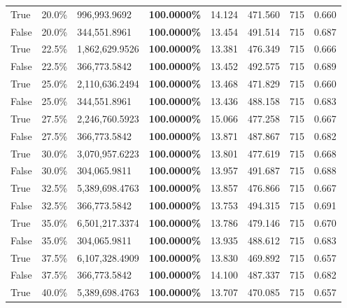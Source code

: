 \begin{table}[H]
\begin{tabular}{lllrllll}
\cline{1-8}
True & 20.0\% & 996,993.9692 & \bfseries \color{red} 100.0000\% & 14.124 & 471.560 & 715 & 0.660 \\
\cline{1-8}
False & 20.0\% & 344,551.8961 & \bfseries \color{red} 100.0000\% & 13.454 & 491.514 & 715 & 0.687 \\
\cline{1-8}
True & 22.5\% & 1,862,629.9526 & \bfseries \color{red} 100.0000\% & 13.381 & 476.349 & 715 & 0.666 \\
\cline{1-8}
False & 22.5\% & 366,773.5842 & \bfseries \color{red} 100.0000\% & 13.452 & 492.575 & 715 & 0.689 \\
\cline{1-8}
True & 25.0\% & 2,110,636.2494 & \bfseries \color{red} 100.0000\% & 13.468 & 471.829 & 715 & 0.660 \\
\cline{1-8}
False & 25.0\% & 344,551.8961 & \bfseries \color{red} 100.0000\% & 13.436 & 488.158 & 715 & 0.683 \\
\cline{1-8}
True & 27.5\% & 2,246,760.5923 & \bfseries \color{red} 100.0000\% & 15.066 & 477.258 & 715 & 0.667 \\
\cline{1-8}
False & 27.5\% & 366,773.5842 & \bfseries \color{red} 100.0000\% & 13.871 & 487.867 & 715 & 0.682 \\
\cline{1-8}
True & 30.0\% & 3,070,957.6223 & \bfseries \color{red} 100.0000\% & 13.801 & 477.619 & 715 & 0.668 \\
\cline{1-8}
False & 30.0\% & 304,065.9811 & \bfseries \color{red} 100.0000\% & 13.957 & 491.687 & 715 & 0.688 \\
\cline{1-8}
True & 32.5\% & 5,389,698.4763 & \bfseries \color{red} 100.0000\% & 13.857 & 476.866 & 715 & 0.667 \\
\cline{1-8}
False & 32.5\% & 366,773.5842 & \bfseries \color{red} 100.0000\% & 13.753 & 494.315 & 715 & 0.691 \\
\cline{1-8}
True & 35.0\% & 6,501,217.3374 & \bfseries \color{red} 100.0000\% & 13.786 & 479.146 & 715 & 0.670 \\
\cline{1-8}
False & 35.0\% & 304,065.9811 & \bfseries \color{red} 100.0000\% & 13.935 & 488.612 & 715 & 0.683 \\
\cline{1-8}
True & 37.5\% & 6,107,328.4909 & \bfseries \color{red} 100.0000\% & 13.830 & 469.892 & 715 & 0.657 \\
\cline{1-8}
False & 37.5\% & 366,773.5842 & \bfseries \color{red} 100.0000\% & 14.100 & 487.337 & 715 & 0.682 \\
\cline{1-8}
True & 40.0\% & 5,389,698.4763 & \bfseries \color{red} 100.0000\% & 13.707 & 470.085 & 715 & 0.657 \\

\end{tabular}
\end{table}
